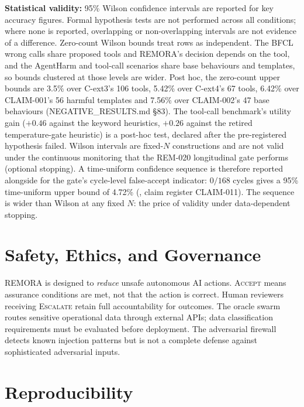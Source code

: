 \documentclass[10pt,twocolumn]{article}
\begin{document}
\textbf{Statistical validity:} 95\% Wilson confidence intervals are
reported for key accuracy figures. Formal hypothesis tests are not performed
across all conditions; where none is reported, overlapping or
non-overlapping intervals are not evidence of a difference. Zero-count
Wilson bounds treat rows as independent. The BFCL wrong calls share
proposed tools and REMORA's decision depends on the tool, and the AgentHarm
and tool-call scenarios share base behaviours and templates, so bounds
clustered at those levels are wider. Post hoc, the zero-count upper
bounds are 3.5\% over C-ext3's 106 tools, 5.42\% over C-ext4's 67 tools,
6.42\% over CLAIM-001's 56 harmful templates and 7.56\% over CLAIM-002's 47
base behaviours (NEGATIVE\_RESULTS.md \S83). The
tool-call benchmark's utility gain ($+0.46$ against the keyword
heuristics, $+0.26$ against the retired temperature-gate heuristic) is
a post-hoc test, declared
after the pre-registered hypothesis failed. Wilson intervals are fixed-$N$
constructions and are not valid under the continuous monitoring that the
REM-020 longitudinal gate performs (optional stopping). A time-uniform
confidence sequence
\cite{ville1939etude,darling1967confidence,howard2021timeuniform,ramdas2023game}
is therefore reported alongside for the gate's cycle-level false-accept
indicator: $0/168$ cycles gives a 95\% time-uniform upper bound of
4.72\% (, claim register
CLAIM-011). The sequence is wider than Wilson at any fixed $N$: the
price of validity under data-dependent stopping.

\section{Safety, Ethics, and Governance}
\label{sec:safety}

REMORA is designed to \emph{reduce} unsafe autonomous AI actions.
\textsc{Accept} means assurance conditions are met, not that the action
is correct. Human reviewers receiving \textsc{Escalate} retain full
accountability for outcomes. The oracle swarm routes sensitive
operational data through external APIs; data classification requirements
must be evaluated before deployment. The adversarial firewall detects
known injection patterns but is not a complete defense against
sophisticated adversarial inputs.

\section{Reproducibility}
\label{sec:repro}
\end{document}
